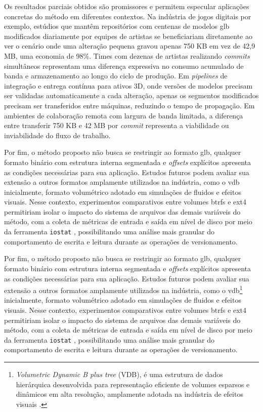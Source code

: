 Os resultados parciais obtidos são promissores e permitem especular aplicações
concretas do método em diferentes contextos. Na indústria de jogos digitais por
exemplo, estúdios que mantêm repositórios com centenas de modelos \gls{glb}
modificados diariamente por equipes de artistas se beneficiariam diretamente ao ver
o cenário onde uma alteração pequena gravou apenas 750 KB em vez de 42,9 MB, uma
economia de 98\%. Times com dezenas de artistas realizando \textit{commits}
simultâneos representam uma diferença expressiva no consumo acumulado de banda e
armazenamento ao longo do ciclo de produção. Em \textit{pipelines} de integração e
entrega contínua para ativos 3D, onde versões de modelos precisam ser validadas
automaticamente a cada alteração, apenas os segmentos modificados precisam ser
transferidos entre máquinas, reduzindo o tempo de propagação. Em ambientes de
colaboração remota com largura de banda limitada, a diferença entre transferir 750
KB e 42 MB por \textit{commit} representa a viabilidade ou inviabilidade do fluxo de
trabalho.

Por fim, o método proposto não busca se restringir ao formato \gls{glb}, qualquer
formato binário com estrutura interna segmentada e \textit{offsets} explícitos
apresenta as condições necessárias para sua aplicação. Estudos futuros podem avaliar
sua extensão a outros formatos amplamente utilizados na indústria, como o
\gls{vdb} inicialmente, formato volumétrico adotado em simulações de fluidos e
efeitos visuais. Nesse contexto, experimentos comparativos entre volumes \gls{btrfs}
e ext4 permitiriam isolar o impacto do sistema de arquivos das demais variáveis do
método, com a coleta de métricas de entrada e saída em nível de disco por meio da
ferramenta \texttt{iostat} \cite{Godard1999}, possibilitando uma análise mais
granular do comportamento de escrita e leitura durante as operações de
versionamento.

Por fim, o método proposto não busca se restringir ao formato \gls{glb}, qualquer
formato binário com estrutura interna segmentada e \textit{offsets} explícitos
apresenta as condições necessárias para sua aplicação. Estudos futuros podem avaliar
sua extensão a outros formatos amplamente utilizados na indústria, como o
\gls{vdb}\footnote{\textit{Volumetric Dynamic B plus tree} (VDB), é uma estrutura de
dados hierárquica desenvolvida para representação eficiente de volumes esparsos e
dinâmicos em alta resolução, amplamente adotada na indústria de efeitos visuais
\cite{Museth2013}.} inicialmente, formato volumétrico adotado em simulações de
fluidos e efeitos visuais. Nesse contexto, experimentos comparativos entre volumes
\gls{btrfs} e ext4 permitiriam isolar o impacto do sistema de arquivos das demais
variáveis do método, com a coleta de métricas de entrada e saída em nível de disco
por meio da ferramenta \texttt{iostat} \cite{Godard1999}, possibilitando uma análise
mais granular do comportamento de escrita e leitura durante as operações de
versionamento.